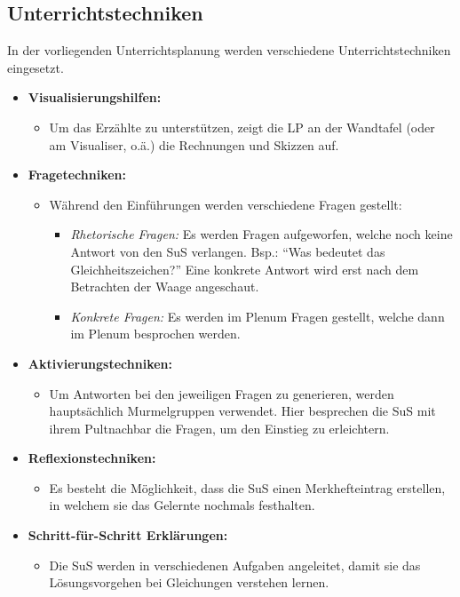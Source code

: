 \documentclass[
  10pt,
  a4paper,
  DIV=11]{scrartcl}
\providecommand{\tightlist}{%
  \setlength{\itemsep}{0pt}\setlength{\parskip}{0pt}}\usepackage{longtable,booktabs,array}
\begin{document}
\subsection{Unterrichtstechniken}\label{unterrichtstechniken}

In der vorliegenden Unterrichtsplanung werden verschiedene
Unterrichtstechniken eingesetzt.

\begin{itemize}
\tightlist
\item
  \textbf{Visualisierungshilfen:}

  \begin{itemize}
  \tightlist
  \item
    Um das Erzählte zu unterstützen, zeigt die LP an der Wandtafel (oder
    am Visualiser, o.ä.) die Rechnungen und Skizzen auf.
  \end{itemize}
\item
  \textbf{Fragetechniken:}

  \begin{itemize}
  \tightlist
  \item
    Während den Einführungen werden verschiedene Fragen gestellt:

    \begin{itemize}
    \tightlist
    \item
      \emph{Rhetorische Fragen:} Es werden Fragen aufgeworfen, welche
      noch keine Antwort von den SuS verlangen. Bsp.: ``Was bedeutet das
      Gleichheitszeichen?'' Eine konkrete Antwort wird erst nach dem
      Betrachten der Waage angeschaut.
    \item
      \emph{Konkrete Fragen:} Es werden im Plenum Fragen gestellt,
      welche dann im Plenum besprochen werden.
    \end{itemize}
  \end{itemize}
\item
  \textbf{Aktivierungstechniken:}

  \begin{itemize}
  \tightlist
  \item
    Um Antworten bei den jeweiligen Fragen zu generieren, werden
    hauptsächlich Murmelgruppen verwendet. Hier besprechen die SuS mit
    ihrem Pultnachbar die Fragen, um den Einstieg zu erleichtern.
  \end{itemize}
\item
  \textbf{Reflexionstechniken:}

  \begin{itemize}
  \tightlist
  \item
    Es besteht die Möglichkeit, dass die SuS einen Merkhefteintrag
    erstellen, in welchem sie das Gelernte nochmals festhalten.
  \end{itemize}
\item
  \textbf{Schritt-für-Schritt Erklärungen:}

  \begin{itemize}
  \tightlist
  \item
    Die SuS werden in verschiedenen Aufgaben angeleitet, damit sie das
    Lösungsvorgehen bei Gleichungen verstehen lernen.
  \end{itemize}
\end{itemize}
\end{document}
